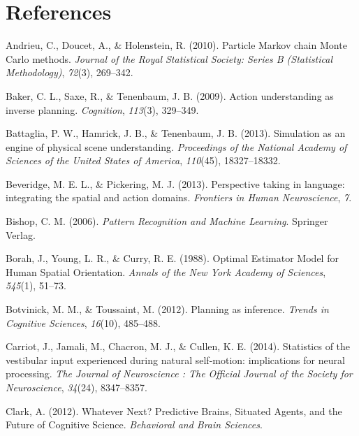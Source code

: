 \documentclass[english,floatsintext,man]{apa6}
\theoremstyle{definition}
\theoremstyle{definition}
\theoremstyle{remark}
\begin{document}
\section{References}\label{references}

\setlength{\parindent}{-0.5in} \setlength{\leftskip}{0.5in}

\hypertarget{refs}{}
\hypertarget{ref-Andrieu:2010gc}{}
Andrieu, C., Doucet, A., \& Holenstein, R. (2010). Particle Markov chain
Monte Carlo methods. \emph{Journal of the Royal Statistical Society:
Series B (Statistical Methodology)}, \emph{72}(3), 269--342.

\hypertarget{ref-Baker:2009kx}{}
Baker, C. L., Saxe, R., \& Tenenbaum, J. B. (2009). Action understanding
as inverse planning. \emph{Cognition}, \emph{113}(3), 329--349.

\hypertarget{ref-Battaglia:2013fm}{}
Battaglia, P. W., Hamrick, J. B., \& Tenenbaum, J. B. (2013). Simulation
as an engine of physical scene understanding. \emph{Proceedings of the
National Academy of Sciences of the United States of America},
\emph{110}(45), 18327--18332.

\hypertarget{ref-Beveridge:2013gx}{}
Beveridge, M. E. L., \& Pickering, M. J. (2013). Perspective taking in
language: integrating the spatial and action domains. \emph{Frontiers in
Human Neuroscience}, \emph{7}.

\hypertarget{ref-Bishop:2006ui}{}
Bishop, C. M. (2006). \emph{Pattern Recognition and Machine Learning}.
Springer Verlag.

\hypertarget{ref-Borah:1988fd}{}
Borah, J., Young, L. R., \& Curry, R. E. (1988). Optimal Estimator Model
for Human Spatial Orientation. \emph{Annals of the New York Academy of
Sciences}, \emph{545}(1), 51--73.

\hypertarget{ref-Botvinick:2012fe}{}
Botvinick, M. M., \& Toussaint, M. (2012). Planning as inference.
\emph{Trends in Cognitive Sciences}, \emph{16}(10), 485--488.

\hypertarget{ref-Carriot:2014fv}{}
Carriot, J., Jamali, M., Chacron, M. J., \& Cullen, K. E. (2014).
Statistics of the vestibular input experienced during natural
self-motion: implications for neural processing. \emph{The Journal of
Neuroscience : The Official Journal of the Society for Neuroscience},
\emph{34}(24), 8347--8357.

\hypertarget{ref-Clark:2012vf}{}
Clark, A. (2012). Whatever Next? Predictive Brains, Situated Agents, and
the Future of Cognitive Science. \emph{Behavioral and Brain Sciences}.
\end{document}
